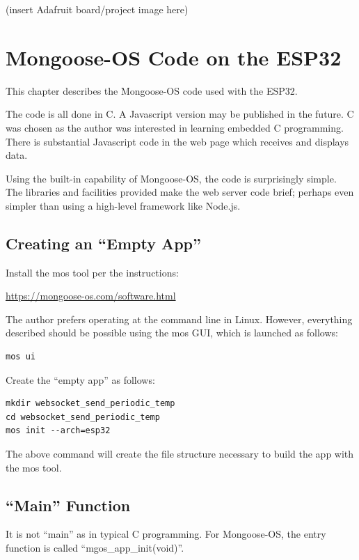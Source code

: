 \documentclass[oneside,letterpaper,12pt]{book}
\begin{document}
(insert Adafruit board/project image here)

\chapter{Mongoose-OS Code on the
ESP32}\label{mongoose-os-code-on-the-esp32}

This chapter describes the Mongoose-OS code used with the ESP32.

The code is all done in C. A Javascript version may be published in the
future. C was chosen as the author was interested in learning embedded C
programming. There is substantial Javascript code in the web page which
receives and displays data.

Using the built-in capability of Mongoose-OS, the code is surprisingly
simple. The libraries and facilities provided make the web server code
brief; perhaps even simpler than using a high-level framework like
Node.js.

\section{\texorpdfstring{Creating an ``Empty
App''}{Creating an Empty App}}\label{creating-an-empty-app}

Install the mos tool per the instructions:

\url{https://mongoose-os.com/software.html}

The author prefers operating at the command line in Linux. However,
everything described should be possible using the mos GUI, which is
launched as follows:

\begin{verbatim}
mos ui
\end{verbatim}

Create the ``empty app'' as follows:

\begin{verbatim}
mkdir websocket_send_periodic_temp
cd websocket_send_periodic_temp
mos init --arch=esp32
\end{verbatim}

The above command will create the file structure necessary to build the
app with the mos tool.

\section{\texorpdfstring{``Main''
Function}{Main Function}}\label{main-function}

It is not ``main'' as in typical C programming. For Mongoose-OS, the
entry function is called ``mgos\_app\_init(void)''.
\end{document}
